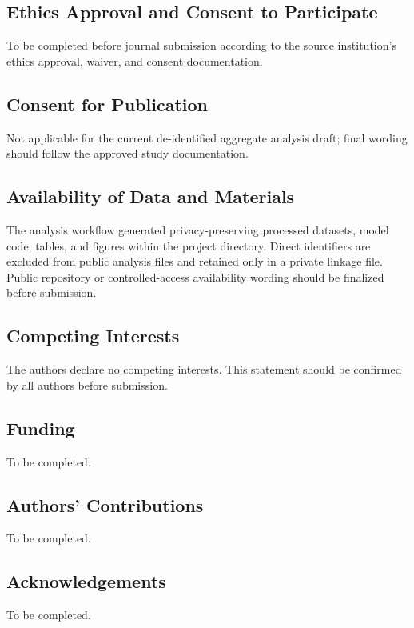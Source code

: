 \documentclass[11pt]{article}
\begin{document}
\subsection*{Ethics Approval and Consent to Participate}
To be completed before journal submission according to the source institution's ethics approval, waiver, and consent documentation.

\subsection*{Consent for Publication}
Not applicable for the current de-identified aggregate analysis draft; final wording should follow the approved study documentation.

\subsection*{Availability of Data and Materials}
The analysis workflow generated privacy-preserving processed datasets, model code, tables, and figures within the project directory. Direct identifiers are excluded from public analysis files and retained only in a private linkage file. Public repository or controlled-access availability wording should be finalized before submission.

\subsection*{Competing Interests}
The authors declare no competing interests. This statement should be confirmed by all authors before submission.

\subsection*{Funding}
To be completed.

\subsection*{Authors' Contributions}
To be completed.

\subsection*{Acknowledgements}
To be completed.



\end{document}
